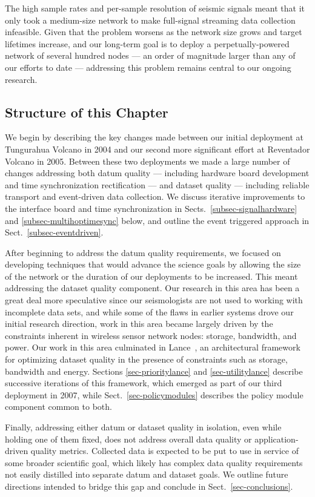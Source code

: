 The high sample rates and per-sample resolution of seismic signals meant that
it only took a medium-size network to make full-signal streaming data
collection infeasible.  Given that the problem worsens as the network size
grows and target lifetimes increase, and our long-term goal is to deploy a
perpetually-powered network of several hundred nodes --- an order of
magnitude larger than any of our efforts to date --- addressing this problem
remains central to our ongoing research.

\subsection{Structure of this Chapter}

We begin by describing the key changes made between our initial deployment at
Tungurahua Volcano in 2004 and our second more significant effort at
Reventador Volcano in 2005.  Between these two deployments we made a large
number of changes addressing both datum quality --- including hardware board
development and time synchronization rectification --- and dataset quality
--- including reliable transport and event-driven data collection. We discuss
iterative improvements to the interface board and time synchronization in
Sects.~\ref{subsec-signalhardware} and \ref{subsec-multihoptimesync} below,
and outline the event triggered approach in Sect.~\ref{subsec-eventdriven}.

After beginning to address the datum quality requirements, we focused on
developing techniques that would advance the science goals by allowing the
size of the network or the duration of our deployments to be increased. This
meant addressing the dataset quality component. Our research in this area has
been a great deal more speculative since our seismologists are not used to
working with incomplete data sets, and while some of the flaws in earlier
systems drove our initial research direction, work in this area became
largely driven by the constraints inherent in wireless sensor network nodes:
storage, bandwidth, and power. Our work in this area culminated in
Lance~\cite{lance-sensys08}, an architectural framework for optimizing
dataset quality in the presence of constraints such as storage, bandwidth and
energy. Sections \ref{sec-prioritylance} and \ref{sec-utilitylance} describe
successive iterations of this framework, which emerged as part of our third
deployment in 2007, while Sect.~\ref{sec-policymodules} describes the
policy module component common to both.

Finally, addressing either datum or dataset quality in isolation, even while
holding one of them fixed, does not address overall data quality or
application-driven quality metrics.  Collected data is expected to be put to
use in service of some broader scientific goal, which likely has complex data
quality requirements not easily distilled into separate datum and dataset
goals.  We outline future directions intended to bridge this gap and conclude
in Sect.~\ref{sec-conclusions}.
